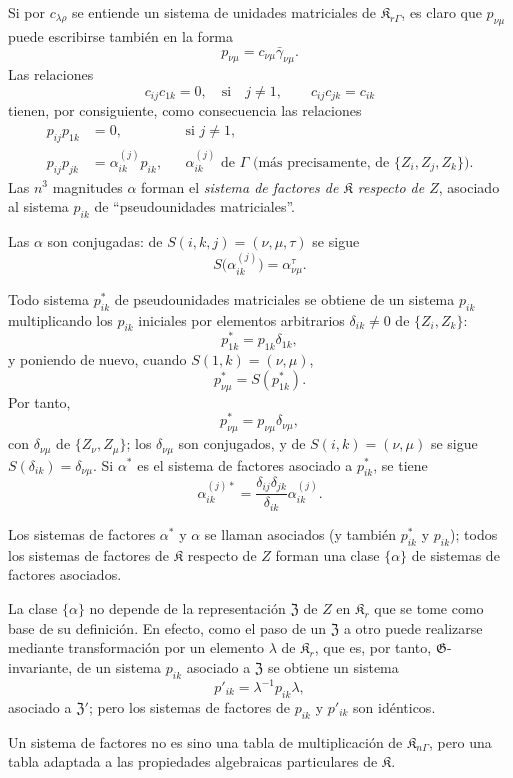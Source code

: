 Si por \(c_{\lambda\rho}\) se entiende un sistema de unidades matriciales de \(\mathfrak K_{r\Gamma}\), es claro que \(p_{\nu\mu}\) puede escribirse también en la forma
\[
p_{\nu\mu}=c_{\nu\mu}\bar\gamma_{\nu\mu}.
\]
Las relaciones
\[
c_{ij}c_{1k}=0,\quad\text{si}\quad j\ne1,
\qquad
c_{ij}c_{jk}=c_{ik}
\]
tienen, por consiguiente, como consecuencia las relaciones
\[
\begin{aligned}
p_{ij}p_{1k}&=0,
&&\text{si }j\ne1,\\
p_{ij}p_{jk}&=\alpha_{ik}^{(j)}p_{ik},
&&\alpha_{ik}^{(j)}\text{ de }\Gamma
\text{ (más precisamente, de }\{Z_i,Z_j,Z_k\}\text{)}.
\end{aligned}
\]
Las \(n^3\) magnitudes \(\alpha\) forman el \emph{sistema de factores de \(\mathfrak K\) respecto de \(Z\)}, asociado al sistema \(p_{ik}\) de ``pseudounidades matriciales''.

Las \(\alpha\) son conjugadas: de \(S(i,k,j)=(\nu,\mu,\tau)\) se sigue
\[
S\bigl(\alpha_{ik}^{(j)}\bigr)=\alpha_{\nu\mu}^{\tau}.
\]

Todo sistema \(p_{ik}^*\) de pseudounidades matriciales se obtiene de un sistema \(p_{ik}\) multiplicando los \(p_{ik}\) iniciales por elementos arbitrarios \(\delta_{ik}\ne0\) de \(\{Z_i,Z_k\}\):
\[
p_{1k}^*=p_{1k}\delta_{1k},
\]
y poniendo de nuevo, cuando \(S(1,k)=(\nu,\mu)\),
\[
p_{\nu\mu}^*=S(p_{1k}^*).
\]
Por tanto,
\[
p_{\nu\mu}^*=p_{\nu\mu}\delta_{\nu\mu},
\]
con \(\delta_{\nu\mu}\) de \(\{Z_\nu,Z_\mu\}\); los \(\delta_{\nu\mu}\) son conjugados, y de \(S(i,k)=(\nu,\mu)\) se sigue \(S(\delta_{ik})=\delta_{\nu\mu}\). Si \(\alpha^*\) es el sistema de factores asociado a \(p_{ik}^*\), se tiene
\[
\alpha_{ik}^{(j)*}
=\frac{\delta_{ij}\delta_{jk}}{\delta_{ik}}\alpha_{ik}^{(j)}.
\]

Los sistemas de factores \(\alpha^*\) y \(\alpha\) se llaman asociados (y también \(p_{ik}^*\) y \(p_{ik}\)); todos los sistemas de factores de \(\mathfrak K\) respecto de \(Z\) forman una clase \(\{\alpha\}\) de sistemas de factores asociados.

La clase \(\{\alpha\}\) no depende de la representación \(\mathfrak Z\) de \(Z\) en \(\mathfrak K_r\) que se tome como base de su definición. En efecto, como el paso de un \(\mathfrak Z\) a otro puede realizarse mediante transformación por un elemento \(\lambda\) de \(\mathfrak K_r\), que es, por tanto, \(\mathfrak G\)-invariante, de un sistema \(p_{ik}\) asociado a \(\mathfrak Z\) se obtiene un sistema
\[
p'_{ik}=\lambda^{-1}p_{ik}\lambda,
\]
asociado a \(\mathfrak Z'\); pero los sistemas de factores de \(p_{ik}\) y \(p'_{ik}\) son idénticos.

Un sistema de factores no es sino una tabla de multiplicación de \(\mathfrak K_{n\Gamma}\), pero una tabla adaptada a las propiedades algebraicas particulares de \(\mathfrak K\).
